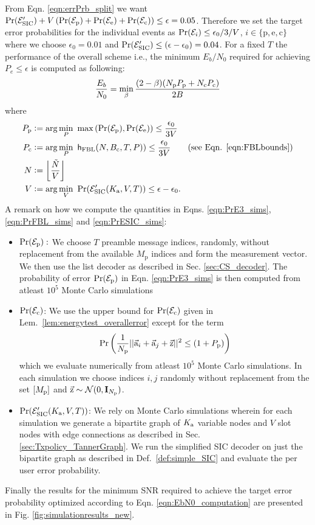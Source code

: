  From Eqn. \ref{eqn:errPrb_split} we want $\mathrm{Pr}(\mathcal{E}'_{\text{SIC}})+V\left(\mathrm{Pr}(\mathcal{E}_{\mathrm{p}})+\mathrm{Pr}(\mathcal{E}_{\mathrm{e}})+\mathrm{Pr}(\mathcal{E}_{\mathrm{c}})\right)\leq \epsilon=0.05$. Therefore we set the target error probabilities for the individual events as $\mathrm{Pr}(\mathcal{E}_i)\leq \epsilon_0/3/V$, $i\in\{\mathrm{p},\mathrm{e},\mathrm{c}\}$ where we choose $\epsilon_0=0.01$ and $\mathrm{Pr}(\mathcal{E}'_{\text{SIC}})\leq (\epsilon-\epsilon_0)=0.04$. For a fixed $T$ the performance of the overall scheme i.e., the minimum $E_b/N_0$ required for achieving $P_e\leq\epsilon$ is computed as following:
\begin{align}
\frac{E_b}{N_0}=\min_{\beta} \frac{(2-\beta)(N_{\mathrm{p}} P_{\mathrm{p}}+N_{\mathrm{c}}P_{\mathrm{c}})}{2B}
\label{eqn:EbN0_computation}
\end{align}
where
\begin{align}
P_{\mathrm{p}}&\mathrel{\mathop:}= \arg\min_{P}~ \max \left(\mathrm{Pr}(\mathcal{E}_{\mathrm{p}}),\mathrm{Pr}(\mathcal{E}_{\mathrm{e}}) \right)\leq \frac{\epsilon_0}{3V}\label{eqn:PrE3_sims}\\
P_{\mathrm{c}}&\mathrel{\mathop:}= \arg\min_{P}~\mathsf{h}_{\text{FBL}}(N,B_\mathrm{c},T,P))\leq \frac{\epsilon_0}{3V}\qquad (\text{see Eqn. }\eqref{eqn:FBLbounds})  \label{eqn:PrFBL_sims}\\
N&\mathrel{\mathop:}=\left\lfloor \frac{\tilde{N}}{V}\right\rfloor \notag\\
V&\mathrel{\mathop:}= \arg\min_{V}~\mathrm{Pr}(\mathcal{E}'_{\text{SIC}}(K_{\text{a}},V,T))\leq \epsilon-\epsilon_0\label{eqn:PrESIC_sims}.
\end{align}
A remark on how we compute the quantities in Eqns. \eqref{eqn:PrE3_sims}, \eqref{eqn:PrFBL_sims} and \eqref{eqn:PrESIC_sims}:
\begin{itemize}
\item $\mathrm{Pr}(\mathcal{E}_{\mathrm{p}}):$ We choose $T$ preamble message indices, randomly, without replacement from the available $M_\mathrm{p}$ indices and form the measurement vector. We then use the list decoder as described in Sec. \ref{sec:CS_decoder}. The probability of error $\mathrm{Pr}(\mathcal{E}_{\mathrm{p}})$ in Eqn. \eqref{eqn:PrE3_sims} is then computed from atleast $10^5$ Monte Carlo simulations
\item $\mathrm{Pr}(\mathcal{E}_{\mathrm{c}})$: We use the upper bound for $\mathrm{Pr}(\mathcal{E}_{\mathrm{c}})$ given in Lem.~\ref{lem:energytest_overallerror} except for the term 
\[
\mathrm{Pr}\left( \frac{1}{N_{\mathrm{p}}}||\vec{\mathrm{a}}_i+\vec{\mathrm{a}}_j+\vec{\mathrm{z}}||^2\leq (1+P_{\mathrm{p}})\right)
\]
which we evaluate numerically from atleast $10^5$ Monte Carlo simulations. In each simulation we choose indices $i,j$ randomly without replacement from the set $[M_{\mathrm{p}}]$ and $\vec{\mathrm{z}}\sim \mathcal{N}(0,\mathbf{I}_{N_{\mathrm{p}}})$.
\item $\mathrm{Pr}(\mathcal{E}'_{\text{SIC}}(K_{\text{a}},V,T))$: We rely on Monte Carlo simulations wherein for each simulation we generate a bipartite graph of $K_{\text{a}}$ variable nodes and $V$ slot nodes with edge connections as described in Sec. \ref{sec:Txpolicy_TannerGraph}. We run the simplified SIC decoder on just the bipartite graph as described in Def.~\ref{def:simple_SIC} and evaluate the per user error probability. 
\end{itemize}
Finally the results for the minimum SNR required to achieve the target error probability optimized according to Eqn. \eqref{eqn:EbN0_computation} are presented in Fig. \ref{fig:simulationresults_new}.
 
